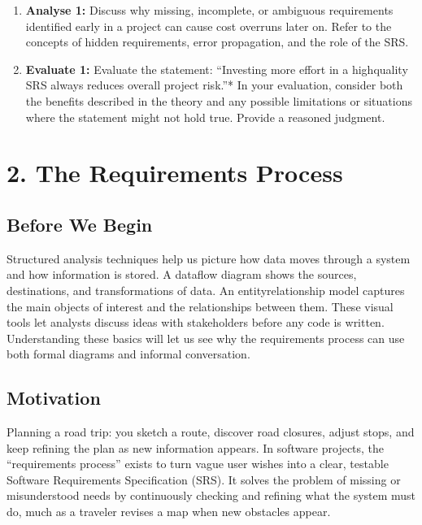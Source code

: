 \documentclass[12pt, a4paper]{article}
\begin{document}
\begin{enumerate}
    \item \textbf{Analyse 1:} Discuss why missing, incomplete, or ambiguous requirements identified early in a project can cause cost overruns later on. Refer to the concepts of hidden requirements, error propagation, and the role of the SRS. \newpage
    
    \item \textbf{Evaluate 1:} Evaluate the statement: ``Investing more effort in a highquality SRS always reduces overall project risk.''* In your evaluation, consider both the benefits described in the theory and any possible limitations or situations where the statement might not hold true. Provide a reasoned judgment. \newpage
\end{enumerate}

\newpage

\section{2. The Requirements Process}
\subsection{Before We Begin}
Structured analysis techniques help us picture how data moves through a system and how information is stored. A dataflow diagram shows the sources, destinations, and transformations of data. An entityrelationship model captures the main objects of interest and the relationships between them. These visual tools let analysts discuss ideas with stakeholders before any code is written. Understanding these basics will let us see why the requirements process can use both formal diagrams and informal conversation.

\subsection{Motivation}
Planning a road trip: you sketch a route, discover road closures, adjust stops, and keep refining the plan as new information appears.  
In software projects, the ``requirements process'' exists to turn vague user wishes into a clear, testable Software Requirements Specification (SRS). It solves the problem of missing or misunderstood needs by continuously checking and refining what the system must do, much as a traveler revises a map when new obstacles appear.
\end{document}
